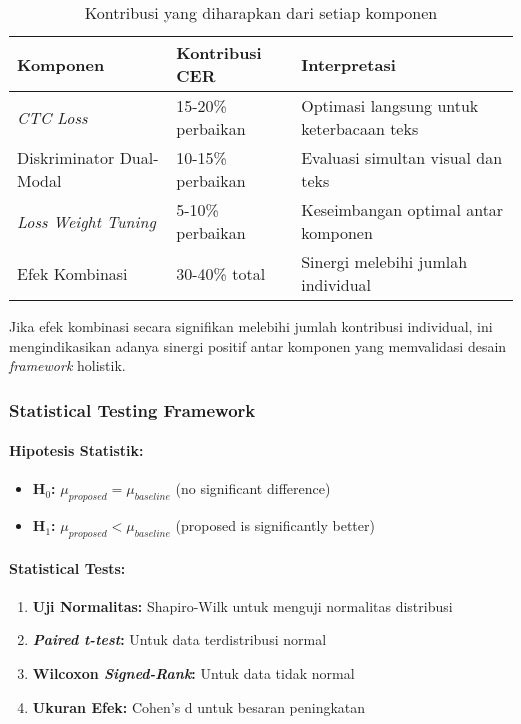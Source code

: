\documentclass[12pt,a4paper]{article}
\begin{document}
\begin{table}[H]
\centering
\caption{Kontribusi yang diharapkan dari setiap komponen}
\label{tab:expected-ablation-results}
\small
\begin{tabular}{|l|l|p{6cm}|}
\hline
\textbf{Komponen} & \textbf{Kontribusi CER} & \textbf{Interpretasi} \\ \hline
\textit{CTC Loss} & 15-20\% perbaikan & Optimasi langsung untuk keterbacaan teks \\ \hline
Diskriminator Dual-Modal & 10-15\% perbaikan & Evaluasi simultan visual dan teks \\ \hline
\textit{Loss Weight Tuning} & 5-10\% perbaikan & Keseimbangan optimal antar komponen \\ \hline
Efek Kombinasi & 30-40\% total & Sinergi melebihi jumlah individual \\ \hline
\end{tabular}
\end{table}

Jika efek kombinasi secara signifikan melebihi jumlah kontribusi individual, ini mengindikasikan adanya sinergi positif antar komponen yang memvalidasi desain \textit{framework} holistik.

\subsubsection{Statistical Testing Framework}
\paragraph{Hipotesis Statistik:}
\begin{itemize}[leftmargin=*, nosep]
\item \textbf{H$_0$:} $\mu_{proposed} = \mu_{baseline}$ (no significant difference)
\item \textbf{H$_1$:} $\mu_{proposed} < \mu_{baseline}$ (proposed is significantly better)
\end{itemize}

\paragraph{Statistical Tests:}
\begin{enumerate}[label=\arabic*., leftmargin=*, nosep]
\item \textbf{Uji Normalitas:} Shapiro-Wilk untuk menguji normalitas distribusi
\item \textbf{\textit{Paired t-test}:} Untuk data terdistribusi normal
\item \textbf{Wilcoxon \textit{Signed-Rank}:} Untuk data tidak normal
\item \textbf{Ukuran Efek:} Cohen's d untuk besaran peningkatan
\end{enumerate}
\end{document}
